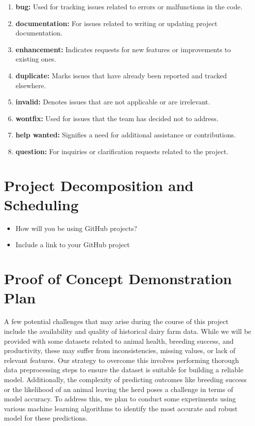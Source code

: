 \documentclass{article}
\begin{document}
\begin{enumerate}
    \item \textbf{bug:} Used for tracking issues related to errors or malfunctions in the code.
    \item \textbf{documentation:} For issues related to writing or updating project documentation.
    \item \textbf{enhancement:} Indicates requests for new features or improvements to existing ones.
    \item \textbf{duplicate:} Marks issues that have already been reported and tracked elsewhere.
    \item \textbf{invalid:} Denotes issues that are not applicable or are irrelevant.
    \item \textbf{wontfix:} Used for issues that the team has decided not to address.
    \item \textbf{help wanted:} Signifies a need for additional assistance or contributions.
    \item \textbf{question:} For inquiries or clarification requests related to the project.
\end{enumerate}

\section{Project Decomposition and Scheduling}

\begin{itemize}
  \item How will you be using GitHub projects?
  \item Include a link to your GitHub project
\end{itemize}


\section{Proof of Concept Demonstration Plan}

A few potential challenges that may arise during the course of this project include the availability and quality of historical dairy farm data. While we will be provided with some datasets related to animal health, breeding success, and productivity, these may suffer from inconsistencies, missing values, or lack of relevant features. Our strategy to overcome this involves performing thorough data preprocessing steps to ensure the dataset is suitable for building a reliable model. Additionally, the complexity of predicting outcomes like breeding success or the likelihood of an animal leaving the herd poses a challenge in terms of model accuracy. To address this, we plan to conduct some experiments using various machine learning algorithms to identify the most accurate and robust model for these predictions.
\end{document}
